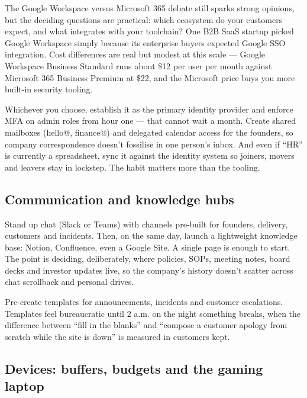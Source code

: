 The Google Workspace versus Microsoft 365 debate still sparks strong opinions, but the deciding questions are practical: which ecosystem do your customers expect, and what integrates with your toolchain? One B2B SaaS startup picked Google Workspace simply because its enterprise buyers expected Google SSO integration. Cost differences are real but modest at this scale — Google Workspace Business Standard runs about \$12 per user per month against Microsoft 365 Business Premium at \$22, and the Microsoft price buys you more built-in security tooling.


Whichever you choose, establish it as the primary identity provider and enforce MFA on admin roles from hour one — that cannot wait a month. Create shared mailboxes (hello@, finance@) and delegated calendar access for the founders, so company correspondence doesn't fossilise in one person's inbox. And even if ``HR'' is currently a spreadsheet, sync it against the identity system so joiners, movers and leavers stay in lockstep. The habit matters more than the tooling.



\subsection{Communication and knowledge hubs}


Stand up chat (Slack or Teams) with channels pre-built for founders, delivery, customers and incidents. Then, on the same day, launch a lightweight knowledge base: Notion, Confluence, even a Google Site. A single page is enough to start. The point is deciding, deliberately, where policies, SOPs, meeting notes, board decks and investor updates live, so the company's history doesn't scatter across chat scrollback and personal drives.


Pre-create templates for announcements, incidents and customer escalations. Templates feel bureaucratic until 2 a.m. on the night something breaks, when the difference between ``fill in the blanks'' and ``compose a customer apology from scratch while the site is down'' is measured in customers kept.



\subsection{Devices: buffers, budgets and the gaming laptop}


